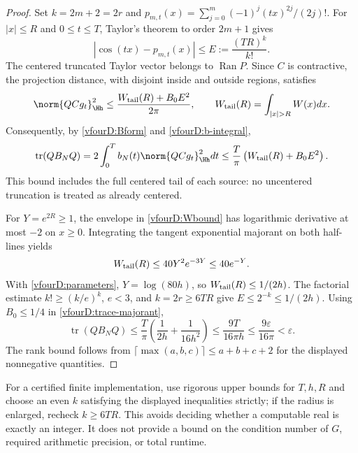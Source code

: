 \begin{proof}
Set $k=2m+2=2r$ and $p_{m,t}(x)=\sum_{j=0}^m(-1)^j(tx)^{2j}/(2j)!$. For $|x|\le R$ and $0\le t\le T$, Taylor's theorem to order $2m+1$ gives
\[|\cos(tx)-p_{m,t}(x)|\le E:=\frac{(TR)^k}{k!}.
\]
The centered truncated Taylor vector belongs to $\operatorname{Ran}P$. Since $C$ is contractive, the projection distance, with disjoint inside and outside regions, satisfies
\begin{equation}\label{vfourD:distance}
 \norm{QCg_t}_{\Hh}^2\le\frac{W_{\rm tail}(R)+B_0E^2}{2\pi},\qquad W_{\rm tail}(R)=\int_{|x|>R}W(x)dx.
\end{equation}
Consequently, by \eqref{vfourD:Bform} and \eqref{vfourD:b-integral},
\begin{equation}\label{vfourD:trace-majorant}
 \operatorname{tr}(QB_NQ)=2\int_0^T b_N(t)\norm{QCg_t}_{\Hh}^2dt
 \le\frac{T}{\pi}\left(W_{\rm tail}(R)+B_0E^2\right).
\end{equation}
This bound includes the full centered tail of each source: no uncentered truncation is treated as already centered.

For $Y=e^{2R}\ge1$, the envelope in \eqref{vfourD:Wbound} has logarithmic derivative at most $-2$ on $x\ge0$. Integrating the tangent exponential majorant on both half-lines yields
\begin{equation}\label{vfourD:Wtail}
 W_{\rm tail}(R)\le40Y^2e^{-3Y}\le40e^{-Y}.
\end{equation}
With \eqref{vfourD:parameters}, $Y=\log(80h)$, so $W_{\rm tail}(R)\le1/(2h)$. The factorial estimate $k!\ge(k/e)^k$, $e<3$, and $k=2r\ge6TR$ give $E\le2^{-k}\le1/(2h)$. Using $B_0\le1/4$ in \eqref{vfourD:trace-majorant},
\[\operatorname{tr}(QB_NQ)\le\frac{T}{\pi}\left(\frac1{2h}+\frac1{16h^2}\right)
 \le\frac{9T}{16\pi h}\le\frac{9\varepsilon}{16\pi}<\varepsilon.
\]
The rank bound follows from $\lceil\max(a,b,c)\rceil\le a+b+c+2$ for the displayed nonnegative quantities.
\end{proof}
For a certified finite implementation, use rigorous upper bounds for $T,h,R$ and choose an even $k$ satisfying the displayed inequalities strictly; if the radius is enlarged, recheck $k\ge6TR$. This avoids deciding whether a computable real is exactly an integer. It does not provide a bound on the condition number of $G$, required arithmetic precision, or total runtime.


